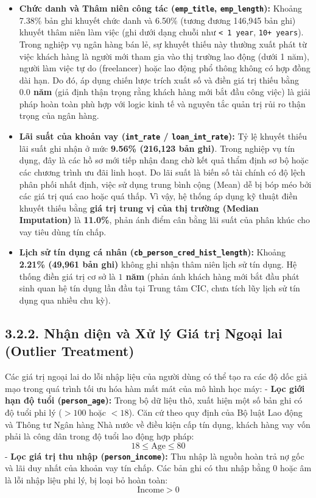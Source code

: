\documentclass[
  13pt,
  a4paper,
]{report}
\providecommand{\tightlist}{%
  \setlength{\itemsep}{0pt}\setlength{\parskip}{0pt}}
\begin{document}
\begin{itemize}
\tightlist
\item
  \textbf{Chức danh và Thâm niên công tác (\texttt{emp\_title},
  \texttt{emp\_length}):} Khoảng 7.38\% bản ghi khuyết chức danh và
  6.50\% (tương đương 146,945 bản ghi) khuyết thâm niên làm việc (ghi
  dưới dạng chuỗi như \texttt{\textless{}\ 1\ year},
  \texttt{10+\ years}). Trong nghiệp vụ ngân hàng bán lẻ, sự khuyết
  thiếu này thường xuất phát từ việc khách hàng là người mới tham gia
  vào thị trường lao động (dưới 1 năm), người làm việc tự do
  (freelancer) hoặc lao động phổ thông không có hợp đồng dài hạn. Do đó,
  áp dụng chiến lược trích xuất số và điền giá trị thiếu bằng
  \textbf{\(0.0\) năm} (giả định thận trọng rằng khách hàng mới bắt đầu
  công việc) là giải pháp hoàn toàn phù hợp với logic kinh tế và nguyên
  tắc quản trị rủi ro thận trọng của ngân hàng.
\item
  \textbf{Lãi suất của khoản vay (\texttt{int\_rate} /
  \texttt{loan\_int\_rate}):} Tỷ lệ khuyết thiếu lãi suất ghi nhận ở mức
  \textbf{9.56\% (216,123 bản ghi)}. Trong nghiệp vụ tín dụng, đây là
  các hồ sơ mới tiếp nhận đang chờ kết quả thẩm định sơ bộ hoặc các
  chương trình ưu đãi linh hoạt. Do lãi suất là biến số tài chính có độ
  lệch phân phối nhất định, việc sử dụng trung bình cộng (Mean) dễ bị
  bóp méo bởi các giá trị quá cao hoặc quá thấp. Vì vậy, hệ thống áp
  dụng kỹ thuật điền khuyết thiếu bằng \textbf{giá trị trung vị của thị
  trường (Median Imputation)} là \textbf{11.0\%}, phản ánh điểm cân bằng
  lãi suất của phân khúc cho vay tiêu dùng tín chấp.
\item
  \textbf{Lịch sử tín dụng cá nhân
  (\texttt{cb\_person\_cred\_hist\_length}):} Khoảng \textbf{2.21\%
  (49,961 bản ghi)} không ghi nhận thâm niên lịch sử tín dụng. Hệ thống
  điền giá trị cơ sở là \textbf{\(1\) năm} (phản ánh khách hàng mới bắt
  đầu phát sinh quan hệ tín dụng lần đầu tại Trung tâm CIC, chưa tích
  lũy lịch sử tín dụng qua nhiều chu kỳ).
\end{itemize}

\subsection{3.2.2. Nhận diện và Xử lý Giá trị Ngoại lai (Outlier
Treatment)}\label{nhux1eadn-diux1ec7n-vuxe0-xux1eed-luxfd-giuxe1-trux1ecb-ngoux1ea1i-lai-outlier-treatment}

Các giá trị ngoại lai do lỗi nhập liệu của người dùng có thể tạo ra các
độ dốc giả mạo trong quá trình tối ưu hóa hàm mất mát của mô hình học
máy: - \textbf{Lọc giới hạn độ tuổi (\texttt{person\_age}):} Trong bộ dữ
liệu thô, xuất hiện một số bản ghi có độ tuổi phi lý (\(> 100\) hoặc
\(< 18\)). Căn cứ theo quy định của Bộ luật Lao động và Thông tư Ngân
hàng Nhà nước về điều kiện cấp tín dụng, khách hàng vay vốn phải là công
dân trong độ tuổi lao động hợp pháp: \[18 \le \text{Age} \le 80\] -
\textbf{Lọc giá trị thu nhập (\texttt{person\_income}):} Thu nhập là
nguồn hoàn trả nợ gốc và lãi duy nhất của khoản vay tín chấp. Các bản
ghi có thu nhập bằng \(0\) hoặc âm là lỗi nhập liệu phi lý, bị loại bỏ
hoàn toàn: \[\text{Income} > 0\]
\end{document}
